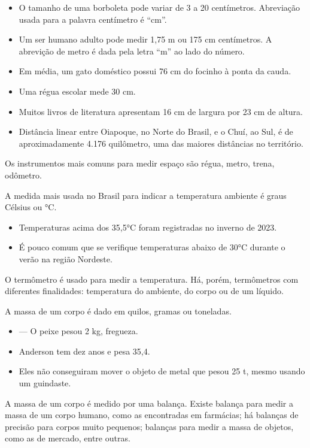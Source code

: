 {\begin{itemize}
\item O tamanho de uma borboleta pode variar de 3 a 20 centímetros. 
Abreviação usada para a palavra centímetro é ``cm''. 
\item Um ser humano adulto pode medir 1,75 m ou 175 cm centímetros. 
A abrevição de metro é dada pela letra ``m'' ao lado do número.
\item Em média, um gato doméstico possui 76 cm do focinho à ponta da cauda.
\item Uma régua escolar mede 30 cm. 
\item Muitos livros de literatura apresentam 16 cm de largura por 23 cm de altura.
\item Distância linear entre Oiapoque, no Norte do Brasil, e o Chuí, ao Sul,
é de aproximadamente 4.176 quilômetro, uma das maiores distâncias no território.
\end{itemize}

Os instrumentos mais comuns para medir espaço são
régua, metro, trena, odômetro.  
\bigskip


A medida mais usada no Brasil para indicar a temperatura ambiente é graus Célsius ou °C. 

\begin{itemize}
\item Temperaturas acima dos 35,5°C foram registradas no inverno de 2023.
\item É pouco comum que se verifique temperaturas abaixo de 30°C durante o verão na região Nordeste.  
\end{itemize}

O termômetro é usado para medir a temperatura. 
Há, porém, termômetros com diferentes finalidades: 
temperatura do ambiente, do corpo ou de um líquido.
\bigskip


A massa de um corpo é dado em quilos, gramas ou toneladas.

\begin{itemize}
  \item --- O peixe pesou 2 kg, fregueza.
  \item Anderson tem dez anos e pesa 35,4.
  \item Eles não conseguiram mover o objeto de metal que pesou 25 t, mesmo usando um guindaste.
\end{itemize}

A massa de um corpo é medido por uma balança. 
Existe balança para medir a massa de um corpo humano, 
como as encontradas em farmácias; 
há balanças de precisão para corpos muito pequenos;
balanças para medir a massa de objetos, como as de mercado, entre outras.

}
